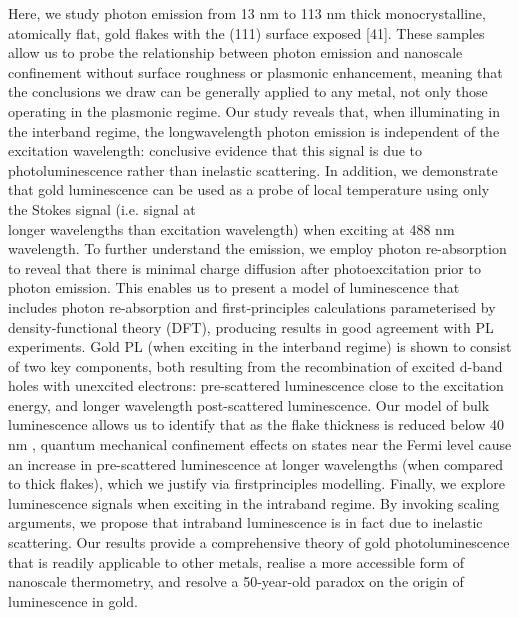 \documentclass[10pt]{article}
\begin{document}
Here, we study photon emission from 13 nm to 113 nm thick monocrystalline, atomically flat, gold flakes with the (111) surface exposed [41]. These samples allow us to probe the relationship between photon emission and nanoscale confinement without surface roughness or plasmonic enhancement, meaning that the conclusions we draw can be generally applied to any metal, not only those operating in the plasmonic regime. Our study reveals that, when illuminating in the interband regime, the longwavelength photon emission is independent of the excitation wavelength: conclusive evidence that this signal is due to photoluminescence rather than inelastic scattering. In addition, we demonstrate that gold luminescence can be used as a probe of local temperature using only the Stokes signal (i.e. signal at\\
longer wavelengths than excitation wavelength) when exciting at 488 nm wavelength. To further understand the emission, we employ photon re-absorption to reveal that there is minimal charge diffusion after photoexcitation prior to photon emission. This enables us to present a model of luminescence that includes photon re-absorption and first-principles calculations parameterised by density-functional theory (DFT), producing results in good agreement with PL experiments. Gold PL (when exciting in the interband regime) is shown to consist of two key components, both resulting from the recombination of excited d-band holes with unexcited electrons: pre-scattered luminescence close to the excitation energy, and longer wavelength post-scattered luminescence. Our model of bulk luminescence allows us to identify that as the flake thickness is reduced below 40 nm , quantum mechanical confinement effects on states near the Fermi level cause an increase in pre-scattered luminescence at longer wavelengths (when compared to thick flakes), which we justify via firstprinciples modelling. Finally, we explore luminescence signals when exciting in the intraband regime. By invoking scaling arguments, we propose that intraband luminescence is in fact due to inelastic scattering. Our results provide a comprehensive theory of gold photoluminescence that is readily applicable to other metals, realise a more accessible form of nanoscale thermometry, and resolve a 50-year-old paradox on the origin of luminescence in gold.
\end{document}
